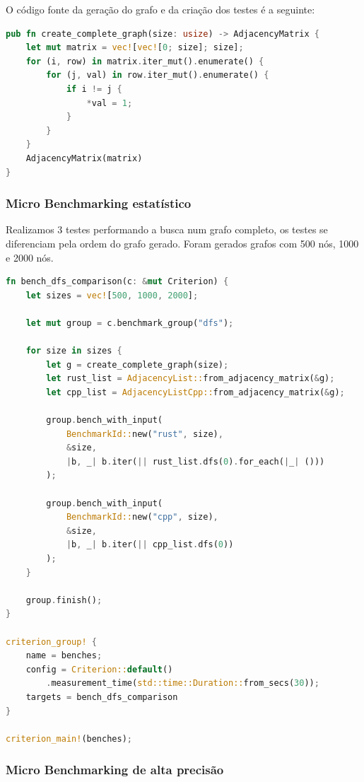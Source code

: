 O código fonte da geração do grafo e da
criação dos testes é a seguinte:

\begin{lstlisting}[language=Rust, caption={Código fonte da geração do grafo completo}]
pub fn create_complete_graph(size: usize) -> AdjacencyMatrix {
    let mut matrix = vec![vec![0; size]; size];
    for (i, row) in matrix.iter_mut().enumerate() {
        for (j, val) in row.iter_mut().enumerate() {
            if i != j {
                *val = 1;
            }
        }
    }
    AdjacencyMatrix(matrix)
}
\end{lstlisting}

\subsubsection{Micro Benchmarking estatístico}

Realizamos 3 testes performando a busca num grafo completo, os testes
se diferenciam pela ordem do grafo gerado. Foram gerados grafos com
500 nós, 1000 e 2000 nós.

\begin{lstlisting}[language=Rust, label={code:micro-dfs}, caption={Código fonte dos testes de Micro Benchmark estatístico da DFS.}]
fn bench_dfs_comparison(c: &mut Criterion) {
    let sizes = vec![500, 1000, 2000];

    let mut group = c.benchmark_group("dfs");

    for size in sizes {
        let g = create_complete_graph(size);
        let rust_list = AdjacencyList::from_adjacency_matrix(&g);
        let cpp_list = AdjacencyListCpp::from_adjacency_matrix(&g);

        group.bench_with_input(
            BenchmarkId::new("rust", size),
            &size,
            |b, _| b.iter(|| rust_list.dfs(0).for_each(|_| ()))
        );

        group.bench_with_input(
            BenchmarkId::new("cpp", size),
            &size,
            |b, _| b.iter(|| cpp_list.dfs(0))
        );
    }

    group.finish();
}

criterion_group! {
    name = benches;
    config = Criterion::default()
        .measurement_time(std::time::Duration::from_secs(30));
    targets = bench_dfs_comparison
}

criterion_main!(benches);
\end{lstlisting}

\subsubsection{Micro Benchmarking de alta precisão}

